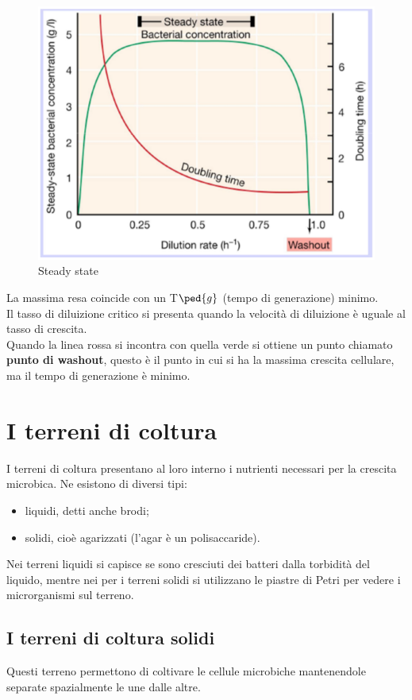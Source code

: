 \documentclass[11pt]{book}
\begin{document}
\clearpage
\begin{figure}[htp]
\centering
\includegraphics[scale=0.4]{img/DIlavamento.png}
\caption{Steady state}
\label{}
\end{figure}

La massima resa coincide con un T$\ped{g}$ (tempo di generazione) minimo.\\	
Il tasso di diluizione critico si presenta quando la velocità di diluizione è uguale al tasso di crescita.\\
Quando la linea rossa si incontra con quella verde si ottiene un punto chiamato \textbf{punto di washout}, questo è il punto in cui si ha la massima crescita cellulare, ma il tempo di generazione è minimo. 


\section{I terreni di coltura}
I terreni di coltura presentano al loro interno i nutrienti necessari per la crescita microbica.
Ne esistono di diversi tipi: 
\begin{itemize}
\item liquidi, detti anche brodi;
\item solidi, cioè agarizzati (l'agar è un polisaccaride).
\end{itemize}


Nei terreni liquidi si capisce se sono cresciuti dei batteri dalla torbidità del liquido, mentre nei per i terreni solidi si utilizzano le piastre di Petri per vedere i microrganismi sul terreno.

\subsection{I terreni di coltura solidi}
Questi terreno permettono di coltivare le cellule microbiche mantenendole separate spazialmente le une dalle altre.
\end{document}
